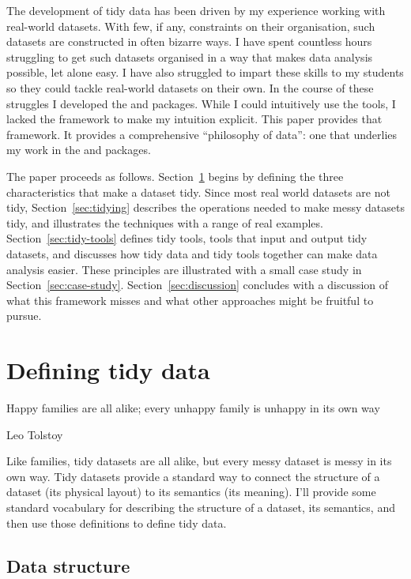 \documentclass[article]{jss}
\begin{document}
The development of tidy data has been driven by my experience working with real-world datasets. With few, if any, constraints on their organisation, such datasets are constructed in often bizarre ways. I have spent countless hours struggling to get such datasets organised in a way that makes data analysis possible, let alone easy. I have also struggled to impart these skills to my students so they could tackle real-world datasets on their own. In the course of these struggles I developed the  and  \citep{wickham:2007b}  packages. While I could intuitively use the tools, I lacked the framework to make my intuition explicit. This paper provides that framework. It provides a comprehensive ``philosophy of data'': one that underlies my work in the  \citep{me:plyr} and  \citep{me:ggplot2} packages.

The paper proceeds as follows. Section~\ref{sec:defining} begins by defining the three characteristics that make a dataset tidy. Since most real world datasets are not tidy, Section~\ref{sec:tidying} describes the operations needed to make messy datasets tidy, and illustrates the techniques with a range of real examples. Section~\ref{sec:tidy-tools} defines tidy tools, tools that input and output tidy datasets, and discusses how tidy data and tidy tools together can make data analysis easier. These principles are illustrated with a small case study in Section~\ref{sec:case-study}. Section~\ref{sec:discussion} concludes with a discussion of what this framework misses and what other approaches might be fruitful to pursue.

\section{Defining tidy data}
\label{sec:defining}

\epigraph{Happy families are all alike; every unhappy family is unhappy in its own way}{Leo Tolstoy}

Like families, tidy datasets are all alike, but every messy dataset is messy in its own way. Tidy datasets provide a standard way to connect the structure of a dataset (its physical layout) to its semantics (its meaning). I'll provide some standard vocabulary for describing the structure of a dataset, its semantics, and then use those definitions to define tidy data.

\subsection{Data structure}
\end{document}
